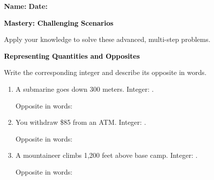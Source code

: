 \documentclass[12pt, letterpaper, fleqn]{article}
\newcommand{\blank}{\underline{\hspace{2.2cm}}}
\newcommand{\blanklong}{\underline{\hspace{6.5cm}}}
\begin{document}
\textbf{Name:} \underline{\hspace{5cm}}
\hfill
\textbf{Date:} \underline{\hspace{3cm}}\\

\begin{tcolorbox}[colback=black!10]
    \large\textcolor{black}{\textbf{Mastery: Challenging Scenarios}}
\end{tcolorbox}

\vspace{3mm}
\noindent
Apply your knowledge to solve these advanced, multi-step problems.

\vspace{4mm}

\begin{tcolorbox}[colback=black!10]
\large\textcolor{black}{\textbf{Representing Quantities and Opposites}}
\end{tcolorbox}

\noindent
Write the corresponding integer and describe its opposite in words.

\vspace{3mm}
\begin{enumerate}[itemsep=2cm, leftmargin=0.6cm]
\item A submarine goes down 300 meters. Integer: \blank. 

Opposite in words: \blanklong

\vspace{2cm}

\item You withdraw \$85 from an ATM. Integer: \blank.

Opposite in words: \blanklong

\vspace{2cm}

\item A mountaineer climbs 1,200 feet above base camp. Integer: \blank. 

Opposite in words: \blanklong

\vspace{2cm}

\end{enumerate}
\end{document}
